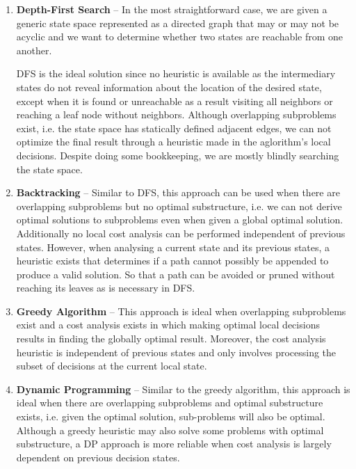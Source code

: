 \documentclass{article}
\begin{document}
    \begin{enumerate}
        \item \textbf{Depth-First Search} --
        In the most straightforward case, we are given a generic state space represented as a directed graph that may or may not be acyclic and we want to determine  whether two states are reachable from one another. 
        
        DFS is the ideal solution since no heuristic is available as the intermediary states do not reveal information about the location of the desired state, except when it is found or unreachable as a result visiting all neighbors or reaching a leaf node without neighbors. Although overlapping subproblems exist, i.e. the state space has statically defined adjacent edges, we can not optimize the final result through a heuristic made in the aglorithm's local decisions. Despite doing some bookkeeping, we are mostly blindly searching the state space.
        
        \item \textbf{Backtracking} -- Similar to DFS, this approach can be used when there are overlapping subproblems but no optimal substructure, i.e. we can not derive optimal solutions to subproblems even when given a global optimal solution. Additionally no local cost analysis can be performed independent of previous states. However, when analysing a current state and its previous states, a heuristic exists that determines if a path cannot possibly be appended to produce a valid solution. So that a path can be avoided or pruned without reaching its leaves as is necessary in DFS.
        
        \item \textbf{Greedy Algorithm} -- This approach is ideal when overlapping subproblems exist and a cost analysis exists in which making optimal local decisions results in finding the globally optimal result. Moreover, the cost analysis heuristic is independent of previous states and only involves processing the subset of decisions at the current local state.

        \item \textbf{Dynamic Programming} --  Similar to the greedy algorithm, this approach is ideal when there are overlapping subproblems and optimal substructure exists, i.e. given the optimal solution, sub-problems will also be optimal. Although a greedy heuristic may also solve some problems with optimal substructure, a DP approach is more reliable when cost analysis is largely dependent on previous decision states.

    \end{enumerate}
    
\end{document}
